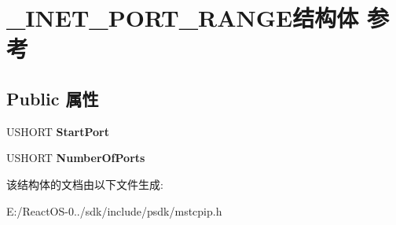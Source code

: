 \hypertarget{struct___i_n_e_t___p_o_r_t___r_a_n_g_e}{}\section{\+\_\+\+I\+N\+E\+T\+\_\+\+P\+O\+R\+T\+\_\+\+R\+A\+N\+G\+E结构体 参考}
\label{struct___i_n_e_t___p_o_r_t___r_a_n_g_e}
\subsection*{Public 属性}
\begin{DoxyCompactItemize}
\item 
\mbox{\label{struct___i_n_e_t___p_o_r_t___r_a_n_g_e_a685028616c331f643714491456dc34b3}} 
U\+S\+H\+O\+RT {\bfseries Start\+Port}
\item 
\mbox{\label{struct___i_n_e_t___p_o_r_t___r_a_n_g_e_ae4517957da2d23788ccd74aa3ef3dec8}} 
U\+S\+H\+O\+RT {\bfseries Number\+Of\+Ports}
\end{DoxyCompactItemize}


该结构体的文档由以下文件生成\+:\begin{DoxyCompactItemize}
\item 
E\+:/\+React\+O\+S-\/0../sdk/include/psdk/mstcpip.\+h\end{DoxyCompactItemize}
